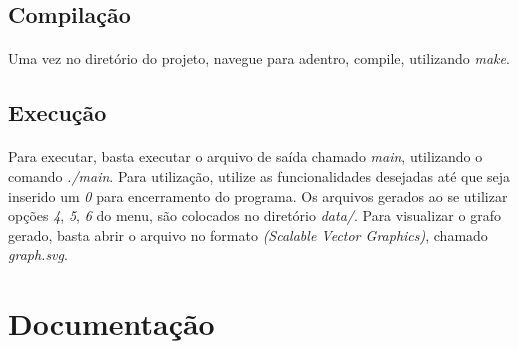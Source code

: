 \documentclass{article}
\begin{document}
			\subsection{Compilação}
				\paragraph{} Uma vez no diretório do projeto, navegue para adentro, compile, utilizando {\it make}.
			
			\subsection{Execução}
				\paragraph{} Para executar, basta executar o arquivo de saída chamado {\it main}, utilizando o comando {\it ./main}. Para utilização, utilize as funcionalidades desejadas até que seja inserido um {\it 0} para encerramento do programa. Os arquivos gerados ao se utilizar opções {\it 4}, {\it 5}, {\it 6} do menu, são colocados no diretório {\it data/}. Para visualizar o grafo gerado, basta abrir o arquivo no formato {\it (Scalable Vector Graphics)}, chamado {\it graph.svg}.
		
    \section{Documentação}
\end{document}
